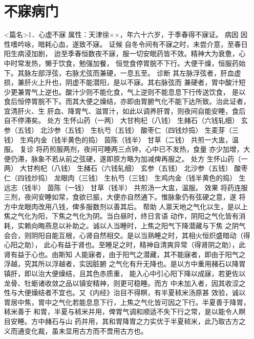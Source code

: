\documentclass[a4paper,12pt,UTF8,twoside]{ctexbook}
\begin{document}
\chapter{不寐病门}
<篇名>1．心虚不寐
属性：天津徐××，年六十六岁，于季春得不寐证。 
病因 因性嗜吟咏，暗耗心血，遂致不寐。 
证候 自冬令间有不寐之时，未尝介意，至春日阳生病浸加剧， 
迨至季春恒数夜不寐，服一切安眠药皆不效。精神大为衰惫，心中时常发热，懒于饮食，勉强加餐， 
恒觉食停胃脘不下行。大便干燥，恒服药始下。其脉左部浮弦，右脉尤弦而兼硬，一息五至。 
诊断 其左脉浮弦者，肝血虚损，兼肝火上升也，阴虚不能潜阳，是以不寐。其右脉弦而 
兼硬者，胃中酸汁短少更兼胃气上逆也。酸汁少则不能化食，气上逆则不能息息下行传送饮食， 
是以食后恒停胃脘不下。而其大便之燥结，亦即由胃腑气化不能下达所致。治此证者，宜清肝火、生 
肝血、降胃气、滋胃汁，如此以调养肝胃，则夜间自能安睡，食后自不停滞矣。 
处方 生怀山药（一两） 大甘枸杞（八钱） 生赭石（六钱轧细） 玄参（五钱） 
北沙参（五钱） 生杭芍（五钱） 酸枣仁（四钱炒捣） 生麦芽（三钱） 
生鸡内金（钱半黄色的捣） 茵陈（钱半） 甘草（二钱） 
共煎一大盅，温服。 
复诊 将药煎服两剂，夜间可睡两三点钟，心中已不发热，食量 
亦少加增，大便仍滞，脉象不若从前之弦硬，遂即原方略为加减俾再服之。 
处方 生怀山药（一两） 大甘枸杞（八钱） 生赭石（六钱轧细） 玄参（五钱） 
北沙参（五钱） 酸枣仁（四钱炒捣） 龙眼肉（三钱） 生杭芍（三钱） 
生鸡内金（钱半黄色的捣） 生远志（钱半） 茵陈（一钱） 甘草（钱半） 
共煎汤一大盅，温服。 
效果 将药连服三剂，夜间安睡如常，食欲已振，大便亦自然通下。惟脉象仍有弦硬之意，遂 
将方中龙眼肉改用八钱，俾多服数剂以善其后。 
帮助 人禀天地之气化以生，是以上焦之气化为阳，下焦之气化为阴。当白昼时，终日言语 
动作，阴阳之气化皆有消耗，实赖向晦燕息以补助之。诚以人当睡时，上焦之阳气下降潜藏与下焦 
之阴气会合，则阴阳自能互根，心肾自然相交。是以当熟睡之时，其相火恒炽盛暗动（得心阳之助）， 
此心有益于肾也。至睡足之时，精神自清爽异常（得肾阴之助），此肾有益于心也。由斯知 
人能寐者，由于阳气之潜藏，其不能寐者，即由于阳气之浮越，究其所以浮越者，实因脏腑 
之气化有升无降也。是以方中重用赭石以降胃镇肝，即以治大便燥结，且其色赤质重， 
能入心中引心阳下降以成寐，若更佐以龙骨、牡蛎诸收敛之品以镇安精神，则更可稳睡。而方 
中未加入者，因其收涩之性与大便燥结者不宜也。又《内经》治目不得瞑，有半夏秫米汤原甚 
效验，诚以胃居中焦，胃中之气化若能息息下行，上焦之气化皆可因之下行。半夏善于降胃，秫米善于 
和胃，半夏与秫米并用，俾胃气调和顺适不失下行之常，是以能令人瞑目安睡。方中赭石与山 
药并用，其和胃降胃之力实优于半夏秫米，此乃取古方之义而通变化裁，虽未显用古方而不啻用古方也。 
\end{document}
